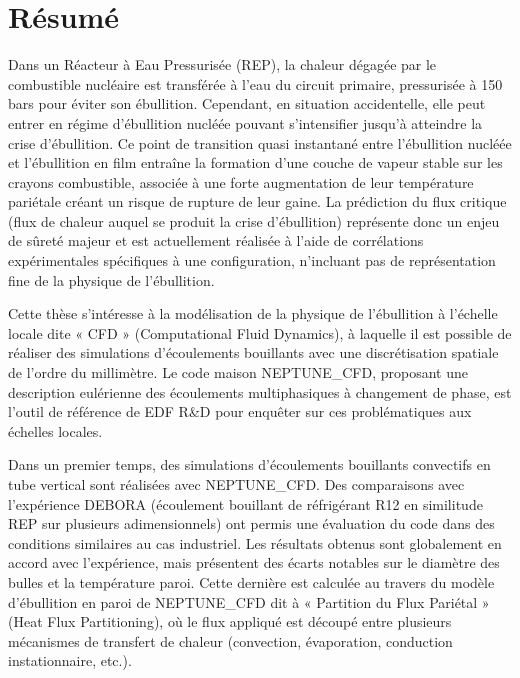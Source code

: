 


\begingroup
\let\clearpage\relax
\let\cleardoublepage\relax
\let\cleardoublepage\relax

\chapter*{Résumé}
Dans un Réacteur à Eau Pressurisée (REP), la chaleur dégagée par le combustible nucléaire est transférée à l’eau du circuit primaire, pressurisée à 150 bars pour éviter son ébullition. Cependant, en situation accidentelle, elle peut entrer en régime d’ébullition nucléée pouvant s’intensifier jusqu’à atteindre la crise d’ébullition. Ce point de transition quasi instantané entre l’ébullition nucléée et l’ébullition en film entraîne la formation d’une couche de vapeur stable sur les crayons combustible, associée à une forte augmentation de leur température pariétale créant un risque de rupture de leur gaine. La prédiction du flux critique (flux de chaleur auquel se produit la crise d’ébullition) représente donc un enjeu de sûreté majeur et est actuellement réalisée à l’aide de corrélations expérimentales spécifiques à une configuration, n’incluant pas de représentation fine de la physique de l’ébullition. 

\npar


Cette thèse s’intéresse à la modélisation de la physique de l’ébullition à l’échelle locale dite « CFD » (Computational Fluid Dynamics), à laquelle il est possible de réaliser des simulations d’écoulements bouillants avec une discrétisation spatiale de l’ordre du millimètre. Le code maison NEPTUNE\_CFD, proposant une description eulérienne des écoulements multiphasiques à changement de phase, est l’outil de référence de EDF R\&D pour enquêter sur ces problématiques aux échelles locales. 

\npar

Dans un premier temps, des simulations d’écoulements bouillants convectifs en tube vertical sont réalisées avec NEPTUNE\_CFD. Des comparaisons avec l’expérience DEBORA (écoulement bouillant de réfrigérant R12 en similitude REP sur plusieurs adimensionnels) ont permis une évaluation du code dans des conditions similaires au cas industriel. Les résultats obtenus sont globalement en accord avec l’expérience, mais présentent des écarts notables sur le diamètre des bulles et la température paroi. Cette dernière est calculée au travers du modèle d’ébullition en paroi de NEPTUNE\_CFD dit à « Partition du Flux Pariétal » (Heat Flux Partitioning), où le flux appliqué est découpé entre plusieurs mécanismes de transfert de chaleur (convection, évaporation, conduction instationnaire, etc.). 

